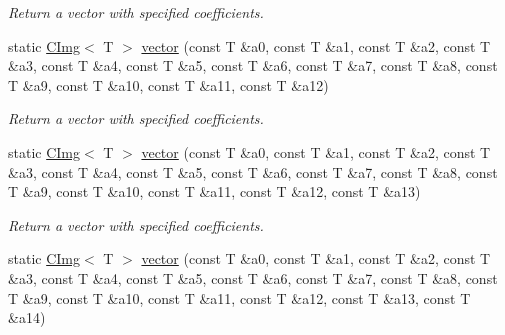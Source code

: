 \begin{DoxyCompactItemize}
\begin{DoxyCompactList}\small\item\em Return a vector with specified coefficients. \item\end{DoxyCompactList}\item 
\hypertarget{structcimg__library_1_1CImg_af28a9ec7a816a3afd9fa1ce6a7d736e3}{
static \hyperlink{structcimg__library_1_1CImg}{CImg}$<$ T $>$ \hyperlink{structcimg__library_1_1CImg_af28a9ec7a816a3afd9fa1ce6a7d736e3}{vector} (const T \&a0, const T \&a1, const T \&a2, const T \&a3, const T \&a4, const T \&a5, const T \&a6, const T \&a7, const T \&a8, const T \&a9, const T \&a10, const T \&a11, const T \&a12)}
\label{structcimg__library_1_1CImg_af28a9ec7a816a3afd9fa1ce6a7d736e3}

\begin{DoxyCompactList}\small\item\em Return a vector with specified coefficients. \item\end{DoxyCompactList}\item 
\hypertarget{structcimg__library_1_1CImg_a60bd022e43e34afb712ae67ab2741603}{
static \hyperlink{structcimg__library_1_1CImg}{CImg}$<$ T $>$ \hyperlink{structcimg__library_1_1CImg_a60bd022e43e34afb712ae67ab2741603}{vector} (const T \&a0, const T \&a1, const T \&a2, const T \&a3, const T \&a4, const T \&a5, const T \&a6, const T \&a7, const T \&a8, const T \&a9, const T \&a10, const T \&a11, const T \&a12, const T \&a13)}
\label{structcimg__library_1_1CImg_a60bd022e43e34afb712ae67ab2741603}

\begin{DoxyCompactList}\small\item\em Return a vector with specified coefficients. \item\end{DoxyCompactList}\item 
\hypertarget{structcimg__library_1_1CImg_a4a45f8df1eae94f9e3225052f9abca1b}{
static \hyperlink{structcimg__library_1_1CImg}{CImg}$<$ T $>$ \hyperlink{structcimg__library_1_1CImg_a4a45f8df1eae94f9e3225052f9abca1b}{vector} (const T \&a0, const T \&a1, const T \&a2, const T \&a3, const T \&a4, const T \&a5, const T \&a6, const T \&a7, const T \&a8, const T \&a9, const T \&a10, const T \&a11, const T \&a12, const T \&a13, const T \&a14)}
\label{structcimg__library_1_1CImg_a4a45f8df1eae94f9e3225052f9abca1b}


\end{DoxyCompactItemize}
